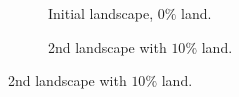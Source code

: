 \begin{figure} 
  \begin{subfigure}[b]{0.5\linewidth}
    \centering
    \caption{Initial landscape, $0\%$ land.} 
    \label{fig:emptylandscape} 
    \vspace{4ex}
  \end{subfigure}%
  \begin{subfigure}[b]{0.5\linewidth}
    \centering
    \caption{2nd landscape with $10\%$ land.} 
    \label{fig:10landscape} 
    \vspace{4ex}
  \end{subfigure} 

\end{figure}
